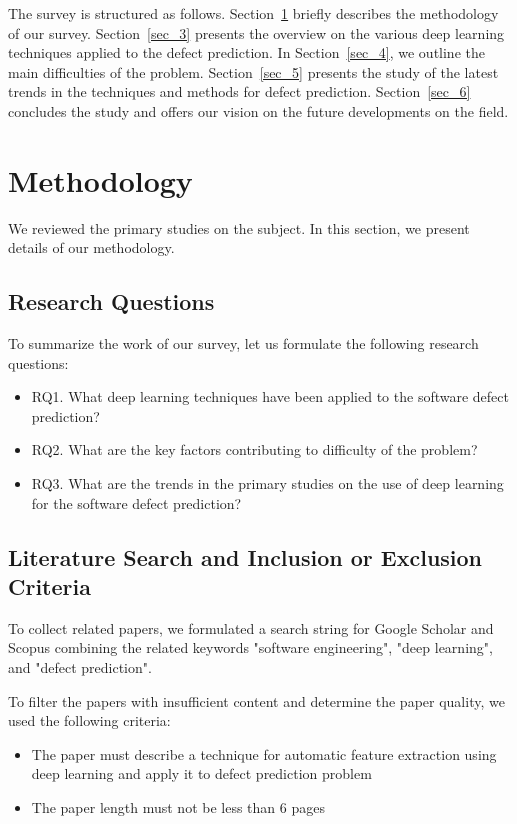 \documentclass[mathematics,review,submit,moreauthors,pdftex]{Definitions/mdpi}
\begin{document}
The survey is structured as follows. Section~\ref{sec_2} briefly describes the methodology of our survey. Section~\ref{sec_3} presents the overview on the various deep learning techniques applied to the defect prediction. In Section~\ref{sec_4}, we outline the main difficulties of the problem. Section~\ref{sec_5} presents the study of the latest trends in the techniques and methods for defect prediction. Section~\ref{sec_6} concludes the study and offers our vision on the future developments on the field.

\section{Methodology}\label{sec_2}

We reviewed the primary studies on the subject. In this section, we present details of our methodology.

\subsection{Research Questions}

To summarize the work of our survey, let us formulate the following research questions:

\begin{itemize}
\item RQ1. What deep learning techniques have been applied to the software defect prediction?
\item RQ2. What are the key factors contributing to difficulty of the problem?
\item RQ3. What are the trends in the primary studies on the use of deep learning for the software defect prediction?
\end{itemize}

\subsection{Literature Search and Inclusion or Exclusion Criteria}

To collect related papers, we formulated a search string for Google Scholar and Scopus combining the related keywords "software engineering", "deep learning", and "defect prediction".

To filter the papers with insufficient content and determine the paper quality, we used the following criteria:

\begin{itemize}
\item The paper must describe a technique for automatic feature extraction using deep learning and apply it to defect prediction problem
\item The paper length must not be less than 6 pages
\end{itemize}
\end{document}
